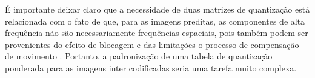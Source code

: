 
É importante deixar claro que a necessidade de duas matrizes de quantização está relacionada com o fato de que, para as imagens preditas, as componentes de alta frequência não são necessariamente frequências espaciais, pois também podem ser provenientes do efeito de blocagem e das limitações o processo de compensação de movimento \cite{ghanbari2003standard}. Portanto, a padronização de uma tabela de quantização ponderada para as imagens inter codificadas seria uma tarefa muito complexa.

